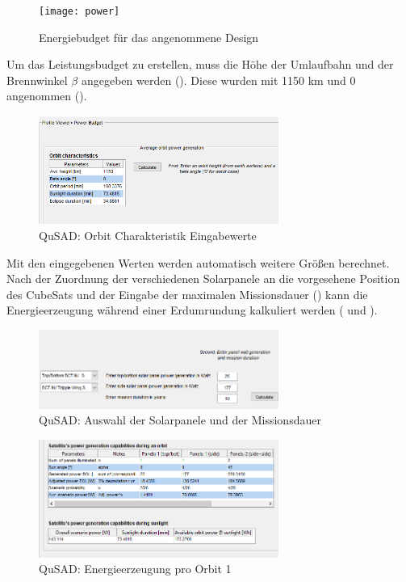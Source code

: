 										\begin{figure}[!h]
											\centering
												\texttt{[image: power]}
											\caption{Energiebudget für das angenommene Design}
											\label{fig:power}
										\end{figure}
Um das Leistungsbudget zu erstellen, muss die Höhe der Umlaufbahn und der Brennwinkel $\beta$ angegeben werden (). Diese wurden mit 1150 km und 0\textdegree{} angenommen ().
\begin{figure}[!h]
	\centering
		\includegraphics[width=0.70\textwidth]{graphics/power1.png}
	\caption{QuSAD: Orbit Charakteristik Eingabewerte}
	\label{fig:power1}
\end{figure}
Mit den eingegebenen Werten werden automatisch weitere Größen berechnet. Nach der Zuordnung der verschiedenen Solarpanele an die vorgesehene Position des CubeSats und der Eingabe der maximalen Missionsdauer () kann die Energieerzeugung während einer Erdumrundung kalkuliert werden ( und ).										

		 \begin{figure}[!h]
				\centering
					\includegraphics[width=0.70\textwidth]{graphics/power2.PNG}
				\caption{QuSAD: Auswahl der Solarpanele und der Missionsdauer}
				\label{fig:power2}
			\end{figure}
			
			\begin{figure}[!h]
				\centering
					\includegraphics[width=0.70\textwidth]{graphics/power3.png}
				\caption{QuSAD: Energieerzeugung pro Orbit 1}
				\label{fig:power3}
			\end{figure}
			
